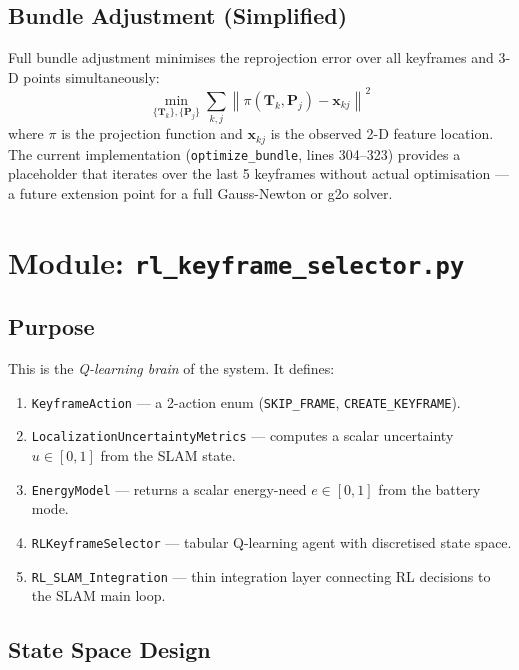 \documentclass[12pt,a4paper,twoside]{report}
\theoremstyle{definition}
\newcommand{\vect}[1]{\bm{#1}}
\newcommand{\mat}[1]{\mathbf{#1}}
\newcommand{\norm}[1]{\left\lVert #1 \right\rVert}
\newcommand{\code}[1]{\texttt{#1}}
\begin{document}
\section{Bundle Adjustment (Simplified)}

Full bundle adjustment minimises the reprojection error over all keyframes
and 3-D points simultaneously:
\[
  \min_{\{\mat{T}_k\},\{\vect{P}_j\}} \sum_{k,j} \norm{\pi(\mat{T}_k, \vect{P}_j) - \vect{x}_{kj}}^2
\]
where $\pi$ is the projection function and $\vect{x}_{kj}$ is the observed
2-D feature location. The current implementation (\code{optimize\_bundle},
lines 304--323) provides a placeholder that iterates over the last 5 keyframes
without actual optimisation --- a future extension point for a full Gauss-Newton
or g2o solver.

\chapter{Module: \texttt{rl\_keyframe\_selector.py}}

\section{Purpose}

This is the \emph{Q-learning brain} of the system. It defines:
\begin{enumerate}
  \item \code{KeyframeAction} --- a 2-action enum (\code{SKIP\_FRAME}, \code{CREATE\_KEYFRAME}).
  \item \code{LocalizationUncertaintyMetrics} --- computes a scalar uncertainty $u \in [0,1]$ from the SLAM state.
  \item \code{EnergyModel} --- returns a scalar energy-need $e \in [0,1]$ from the battery mode.
  \item \code{RLKeyframeSelector} --- tabular Q-learning agent with discretised state space.
  \item \code{RL\_SLAM\_Integration} --- thin integration layer connecting RL decisions to the SLAM main loop.
\end{enumerate}

\section{State Space Design}
\end{document}
